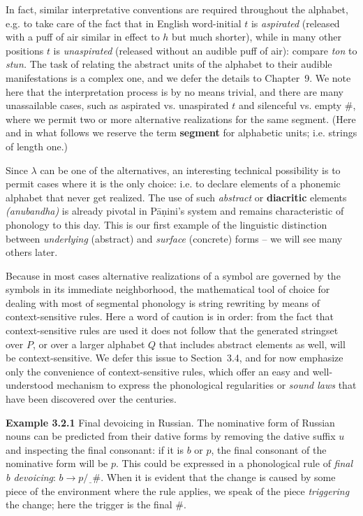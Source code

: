 In fact, similar interpretative conventions are required throughout the
alphabet, e.g. to take care of the fact that in English word-initial $t$ is
{\it aspirated} (released with a puff of air similar in
effect to $h$ but much shorter), while in many other positions $t$ is {\it
unaspirated} (released without an audible puff of air): compare {\it ton} to
{\it stun.} The task of relating the abstract units of the alphabet to their
audible manifestations is a complex one, and we defer the details to
Chapter~9. We note here that the interpretation process is by no means
trivial, and there are many unassailable cases, such as aspirated vs.
unaspirated $t$ and silenceful vs. empty \#, where we permit two or more
alternative realizations for the same segment. (Here and in what follows we
reserve the term {\bf segment} for alphabetic units; i.e. strings of length
one.)   

Since $\lambda$ can be one of the alternatives, an interesting technical
possibility is to permit cases where it is the only choice: i.e. to declare
elements of a phonemic alphabet that never get realized. The use of such {\it
  abstract} or {\bf diacritic} elements {\it (anubandha)} is already pivotal
in P\={a}\d{n}ini's system and remains characteristic of phonology to this
day. This is our first
example of the linguistic distinction between {\it underlying} (abstract) and
{\it surface} (concrete) forms -- we will see many others
later.

Because in most cases alternative realizations of a symbol are governed by the
symbols in its immediate neighborhood, the mathematical tool of choice for
dealing with most of segmental phonology is string rewriting by means of
context-sensitive rules. Here a word of caution is in order: from the fact
that context-sensitive rules are used it does not follow that the generated
stringset over $P$, or over a larger alphabet $Q$ that includes abstract
elements as well, will be context-sensitive. We defer this issue to Section~3.4, and
for now emphasize only the convenience of context-sensitive rules, which offer
an easy and well-understood mechanism to express the phonological regularities
or {\it sound laws} that have been discovered over the centuries. 

\smallskip\noindent
{\bf Example 3.2.1} Final devoicing in Russian. The nominative form of Russian
nouns can be predicted from their dative forms by removing the dative suffix
$u$ and inspecting the final consonant: if it is $b$ or $p$, the final
consonant of the nominative form will be $p$.  This could be expressed in a
phonological rule of {\it final b devoicing}: $b \rightarrow p / \underline{\
\ }\#$. When it is evident that the change is caused by some piece of the
environment where the rule applies, we speak of the piece {\it triggering} 
the change; here the trigger is the final $\#$.\index{trigger}

